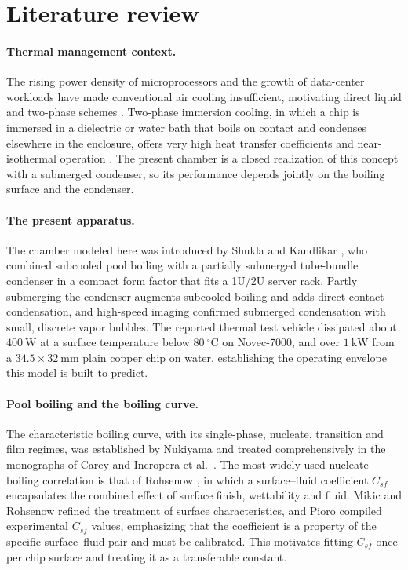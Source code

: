 \documentclass[11pt]{article}
\begin{document}
\section{Literature review}

\paragraph{Thermal management context.}
The rising power density of microprocessors and the growth of data-center workloads have
made conventional air cooling insufficient, motivating direct liquid and two-phase
schemes \cite{mudawar2001,azarifar2024}. Two-phase immersion cooling, in which a chip is
immersed in a dielectric or water bath that boils on contact and condenses elsewhere in
the enclosure, offers very high heat transfer coefficients and near-isothermal operation
\cite{birbarah2020,wu2025}. The present chamber is a closed realization of this concept
with a submerged condenser, so its performance depends jointly on the boiling surface and
the condenser.

\paragraph{The present apparatus.}
The chamber modeled here was introduced by Shukla and Kandlikar \cite{shukla2024}, who combined
subcooled pool boiling with a partially submerged tube-bundle condenser in a compact form factor
that fits a 1U/2U server rack. Partly submerging the condenser augments subcooled boiling and adds
direct-contact condensation, and high-speed imaging confirmed submerged condensation with small,
discrete vapor bubbles. The reported thermal test vehicle dissipated about $400~\mathrm{W}$ at a
surface temperature below $80~^\circ$C on Novec-7000, and over $1~\mathrm{kW}$ from a
$34.5\times32~\mathrm{mm}$ plain copper chip on water, establishing the operating envelope this
model is built to predict.

\paragraph{Pool boiling and the boiling curve.}
The characteristic boiling curve, with its single-phase, nucleate, transition and film
regimes, was established by Nukiyama \cite{nukiyama1934} and treated comprehensively in
the monographs of Carey \cite{carey2008} and Incropera et al.\ \cite{incropera2007}. The
most widely used nucleate-boiling correlation is that of Rohsenow \cite{rohsenow1952}, in
which a surface--fluid coefficient $C_{sf}$ encapsulates the combined effect of surface
finish, wettability and fluid. Mikic and Rohsenow \cite{mikic1969} refined the treatment
of surface characteristics, and Pioro \cite{pioro1999} compiled experimental $C_{sf}$
values, emphasizing that the coefficient is a property of the specific surface--fluid pair
and must be calibrated. This motivates fitting $C_{sf}$ once per chip surface and treating
it as a transferable constant.
\end{document}
